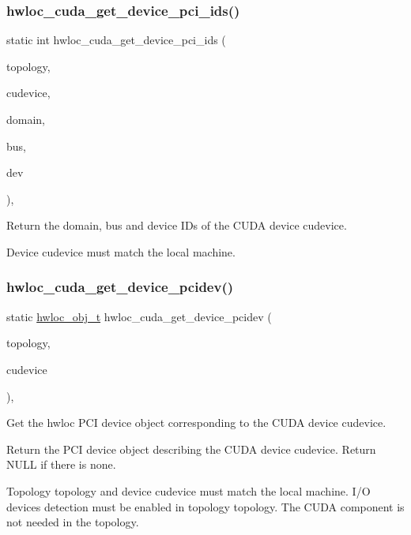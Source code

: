 \subsubsection{\texorpdfstring{hwloc\+\_\+cuda\+\_\+get\+\_\+device\+\_\+pci\+\_\+ids()}{hwloc\_cuda\_get\_device\_pci\_ids()}}
{\footnotesize\ttfamily static int hwloc\+\_\+cuda\+\_\+get\+\_\+device\+\_\+pci\+\_\+ids (\begin{DoxyParamCaption}\item[{\hyperlink{a00186_ga9d1e76ee15a7dee158b786c30b6a6e38}{hwloc\+\_\+topology\+\_\+t}}]{topology,  }\item[{C\+Udevice}]{cudevice,  }\item[{int $\ast$}]{domain,  }\item[{int $\ast$}]{bus,  }\item[{int $\ast$}]{dev }\end{DoxyParamCaption})\hspace{0.3cm}{\ttfamily [inline]}, {\ttfamily [static]}}



Return the domain, bus and device I\+Ds of the C\+U\+DA device {\ttfamily cudevice}. 

Device {\ttfamily cudevice} must match the local machine. \mbox{\label{a00219_ga11fed607fa404e29e8da010f3ec128e4}} 
\subsubsection{\texorpdfstring{hwloc\+\_\+cuda\+\_\+get\+\_\+device\+\_\+pcidev()}{hwloc\_cuda\_get\_device\_pcidev()}}
{\footnotesize\ttfamily static \hyperlink{a00185_ga79b8ab56877ef99ac59b833203391c7d}{hwloc\+\_\+obj\+\_\+t} hwloc\+\_\+cuda\+\_\+get\+\_\+device\+\_\+pcidev (\begin{DoxyParamCaption}\item[{\hyperlink{a00186_ga9d1e76ee15a7dee158b786c30b6a6e38}{hwloc\+\_\+topology\+\_\+t}}]{topology,  }\item[{C\+Udevice}]{cudevice }\end{DoxyParamCaption})\hspace{0.3cm}{\ttfamily [inline]}, {\ttfamily [static]}}



Get the hwloc P\+CI device object corresponding to the C\+U\+DA device {\ttfamily cudevice}. 

Return the P\+CI device object describing the C\+U\+DA device {\ttfamily cudevice}. Return N\+U\+LL if there is none.

Topology {\ttfamily topology} and device {\ttfamily cudevice} must match the local machine. I/O devices detection must be enabled in topology {\ttfamily topology}. The C\+U\+DA component is not needed in the topology. 